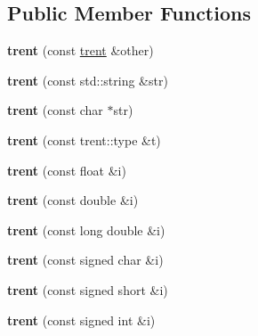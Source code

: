 \subsection*{Public Member Functions}
\begin{DoxyCompactItemize}
\item 
{\bfseries trent} (const \hyperlink{classgxx_1_1trent}{trent} \&other)\hypertarget{classgxx_1_1trent_ac805ee34410c66868db97ceafb9f2791}{}\label{classgxx_1_1trent_ac805ee34410c66868db97ceafb9f2791}

\item 
{\bfseries trent} (const std\+::string \&str)\hypertarget{classgxx_1_1trent_a3c46cd9369addaf1427aae4f2ac9af29}{}\label{classgxx_1_1trent_a3c46cd9369addaf1427aae4f2ac9af29}

\item 
{\bfseries trent} (const char $\ast$str)\hypertarget{classgxx_1_1trent_a1cf97b0f8dd8aad0c0c43392c273447f}{}\label{classgxx_1_1trent_a1cf97b0f8dd8aad0c0c43392c273447f}

\item 
{\bfseries trent} (const trent\+::type \&t)\hypertarget{classgxx_1_1trent_aed159ba7ee0aa58299888787083b6e82}{}\label{classgxx_1_1trent_aed159ba7ee0aa58299888787083b6e82}

\item 
{\bfseries trent} (const float \&i)\hypertarget{classgxx_1_1trent_a8de8bcbf723df21c19ca2b6f0bd19a81}{}\label{classgxx_1_1trent_a8de8bcbf723df21c19ca2b6f0bd19a81}

\item 
{\bfseries trent} (const double \&i)\hypertarget{classgxx_1_1trent_a6cc932f2bbfafc4da273a16f6e75b458}{}\label{classgxx_1_1trent_a6cc932f2bbfafc4da273a16f6e75b458}

\item 
{\bfseries trent} (const long double \&i)\hypertarget{classgxx_1_1trent_a81c8a8bbefe720ee7b5967ff2683fe8f}{}\label{classgxx_1_1trent_a81c8a8bbefe720ee7b5967ff2683fe8f}

\item 
{\bfseries trent} (const signed char \&i)\hypertarget{classgxx_1_1trent_af2ee60ae5a938d52b06e47bd214c316f}{}\label{classgxx_1_1trent_af2ee60ae5a938d52b06e47bd214c316f}

\item 
{\bfseries trent} (const signed short \&i)\hypertarget{classgxx_1_1trent_aaba8a3a42c4d7b7e91b63bc66afd8da1}{}\label{classgxx_1_1trent_aaba8a3a42c4d7b7e91b63bc66afd8da1}

\item 
{\bfseries trent} (const signed int \&i)\hypertarget{classgxx_1_1trent_a5b1c1aa563584622af15e68a9edae160}{}\label{classgxx_1_1trent_a5b1c1aa563584622af15e68a9edae160}


\end{DoxyCompactItemize}
